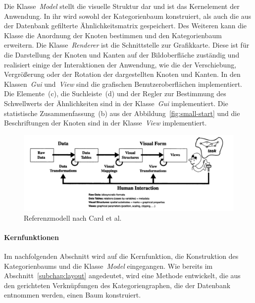 Die Klasse~\emph{Model} stellt die visuelle Struktur dar und ist das Kernelement der Anwendung.
In ihr wird sowohl der Kategorienbaum konstruiert, als auch die aus der Datenbank gefilterte Ähnlichkeitsmatrix gespeichert.
Des Weiteren kann die Klasse die Anordnung der Knoten bestimmen und den Kategorienbaum erweitern.
Die Klasse~\emph{Renderer} ist die Schnittstelle zur Grafikkarte.
Diese ist für die Darstellung der Knoten und Kanten auf der Bildoberfläche zuständig und realisiert einige der Interaktionen der Anwendung, wie die der Verschiebung, Vergrößerung oder der Rotation der dargestellten Knoten und Kanten.
In den Klassen~\emph{Gui} und~\emph{View} sind die grafischen Benutzeroberflächen implementiert.
Die Elemente~(c), die Suchleiste~(d) und der Regler zur Bestimmung des Schwellwerts der Ähnlichkeiten sind in der Klasse~\emph{Gui} implementiert.
Die statistische Zusammenfassung~(b) aus der Abbildung~\ref{fig:small-start} und die Beschriftungen der Knoten sind in der Klasse~\emph{View} implementiert.


\begin{figure}
    \centering
    \includegraphics[width=\textwidth]{images/card-model}
    \caption{Referenzmodell nach Card et al. \cite{card1999readings} }
    \label{fig:ref-model}
\end{figure}



\paragraph{Kernfunktionen}
Im nachfolgenden Abschnitt wird auf die Kernfunktion, die Konstruktion des Kategorienbaums und die Klasse~\emph{Model} eingegangen.
Wie bereits im Abschnitt~\ref{subchap:layout} angedeutet, wird eine Methode entwickelt, die aus den gerichteten Verknüpfungen des Kategoriengraphen, die der Datenbank entnommen werden, einen Baum konstruiert.

